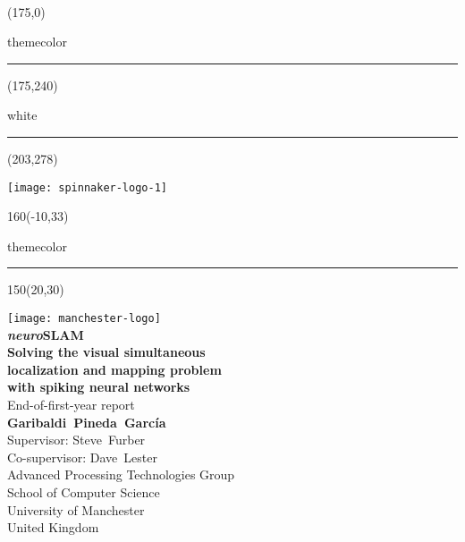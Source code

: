 \setlength{\TPHorizModule}{1mm}
\setlength{\TPVertModule}{1mm}
  ~
  \begin{textblock}{50}(175,0)
    \begin{color}{themecolor}
      \rule{3cm}{30cm}
    \end{color}
  \end{textblock}
  
  \begin{textblock}{50}(175,240)
    \begin{color}{white}
      \rule{32mm}{40mm}
    \end{color}
  \end{textblock}
  
  \begin{textblock}{20}(203,278)
    \begin{rotate}{90}
      \texttt{[image: spinnaker-logo-1]}
    \end{rotate}
  \end{textblock}
  
  \begin{textblock}{160}(-10,33)
    \begin{color}{themecolor}
      \rule{18.4cm}{2.2cm}
    \end{color}
  \end{textblock}


  
  \begin{textblock}{150}(20,30)
    \begin{flushright}
    \texttt{[image: manchester-logo]}\\[5em]
    
    {\noindent\Huge\bfseries \textsf{\textit{neuro}SLAM}\\ 
      Solving the visual simultaneous \\
      localization and mapping problem \\[0.3em]
      with spiking neural networks
    }\\[1em]
    
    {\noindent\huge End-of-first-year report }\\[5em]
    
    {\noindent\Large\bfseries Garibaldi~Pineda~García}\\[0.5em]
    {\noindent\Large Supervisor: Steve~Furber}\\[0.1em]
    {\noindent\Large Co-supervisor: Dave~Lester}\\[1em]
    {\noindent\large Advanced Processing Technologies Group\\
      School of Computer Science \\
      University of Manchester\\[0.4em]
      United Kingdom}
    \end{flushright}
  \end{textblock}

